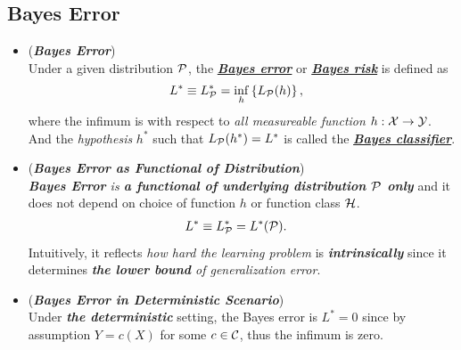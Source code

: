 \documentclass[11pt]{article}
\begin{document}
\begin{itemize}
\end{itemize}

\subsection{Bayes Error}
\begin{itemize}
\item  \begin{definition} (\emph{\textbf{Bayes Error}})\\
Under a given distribution ${\mathcal P}$,  the \underline{\emph{\textbf{Bayes error}}} or \underline{\emph{\textbf{Bayes risk}}} is defined as 
\begin{align}
L^{*} \equiv L_{{\mathcal P}}^{*} &= \inf_{h}\left\{L_{{\mathcal P}}(h)\right\}, \label{expr: Bayes_err}
\end{align} where the infimum is with respect to \emph{all measureable function} $h: {\mathcal X} \rightarrow {\mathcal Y}$. And the \emph{hypothesis} $h^{*}$ such that $L_{{\mathcal P}}(h^{*})= L^{*}$ is called the \underline{\emph{\textbf{Bayes classifier}}}.
\end{definition}

\item \begin{remark} (\textbf{\emph{Bayes Error as Functional of Distribution}})\\
\emph{\textbf{Bayes Error} is \textbf{a functional of underlying distribution ${\mathcal P}$ only}} and it does not depend on choice of function $h$ or function class ${\mathcal H}$.
\begin{align*}
 L^{*} \equiv L_{{\mathcal P}}^{*} &=  L^{*}({\mathcal P}).
\end{align*} Intuitively, it reflects \emph{how hard the learning problem} is \emph{\textbf{intrinsically}} since it determines \emph{\textbf{the lower bound} of generalization error}.
\end{remark}

\item \begin{remark}  (\emph{\textbf{Bayes Error in Deterministic Scenario}})\\
Under \emph{\textbf{the deterministic}} setting, the Bayes error is $L^{*}=0$ since by assumption $Y = c(X)$ for some $c \in {\mathcal C}$, thus the infimum is zero. 
\end{remark}


\end{itemize}
\end{document}

